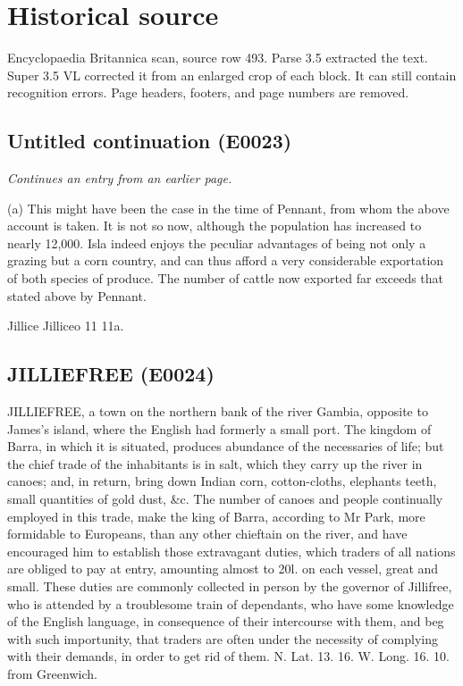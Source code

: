 \documentclass{article}
\begin{document}
\section*{Historical source}
Encyclopaedia Britannica scan, source row 493. Parse 3.5 extracted the text. Super 3.5 VL corrected it from an enlarged crop of each block. It can still contain recognition errors.
Page headers, footers, and page numbers are removed.

\subsection*{Untitled continuation (E0023)}
\textit{Continues an entry from an earlier page.}

(a) This might have been the case in the time of Pennant, from whom the above account is taken. It is not so now, although the population has increased to nearly 12,000. Isla indeed enjoys the peculiar advantages of being not only a grazing but a corn country, and can thus afford a very considerable exportation of both species of produce. The number of cattle now exported far exceeds that stated above by Pennant.

Jillice
Jilliceo
11
11a.

\subsection*{JILLIEFREE (E0024)}
JILLIEFREE, a town on the northern bank of the river Gambia, opposite to James's island, where the English had formerly a small port. The kingdom of Barra, in which it is situated, produces abundance of the necessaries of life; but the chief trade of the inhabitants is in salt, which they carry up the river in canoes; and, in return, bring down Indian corn, cotton-cloths, elephants teeth, small quantities of gold dust, \&c. The number of canoes and people continually employed in this trade, make the king of Barra, according to Mr Park, more formidable to Europeans, than any other chieftain on the river, and have encouraged him to establish those extravagant duties, which traders of all nations are obliged to pay at entry, amounting almost to 20l. on each vessel, great and small. These duties are commonly collected in person by the governor of Jillifree, who is attended by a troublesome train of dependants, who have some knowledge of the English language, in consequence of their intercourse with them, and beg with such importunity, that traders are often under the necessity of complying with their demands, in order to get rid of them. N. Lat. 13. 16. W. Long. 16. 10. from Greenwich.
\end{document}
